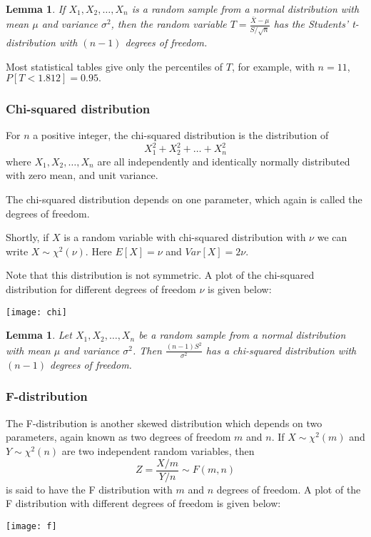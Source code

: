 \documentclass[12pt]{article}
\newtheorem{lemma}[theorem]{Lemma}
\begin{document}
\begin{lemma}
If $X_{1},X_{2},\ldots,X_{n}$ is a random sample from a normal distribution with mean $\mu$ and variance $\sigma^2$, then the random variable $\displaystyle T=\frac{\bar{X}-\mu}{S/\sqrt{n}}$ has the Students' t-distribution with $(n-1)$ degrees of freedom.
\end{lemma}
Most statistical tables give only the percentiles of $T$, for example, with $n=11$, $P[T<1.812]=0.95.$

\subsubsection{Chi-squared distribution}
For $n$ a positive integer, the chi-squared distribution is the distribution of
$$
X_{1}^{2}+X_{2}^{2}+\ldots+X_{n}^{2}
$$
where
$X_{1},X_{2},\ldots,X_{n}$ are all independently and identically normally distributed with zero mean, and unit variance.

The chi-squared distribution depends on one parameter, which again is called the degrees of freedom.

Shortly, if $X$ is a random variable with chi-squared distribution with $\nu$ we can write $X \sim \chi^{2}(\nu)$. Here $E[X]=\nu$ and $Var[X]=2\nu$.

Note that this distribution is not symmetric. A plot of the chi-squared distribution for different degrees of freedom $\nu$ is given below:
\begin{center}
  \texttt{[image: chi]}
\end{center}



\begin{lemma}
Let $X_{1},X_{2},\ldots,X_{n}$ be a random sample from a normal distribution with mean $\mu$ and variance $\sigma^2$. Then $\displaystyle \frac{(n-1)S^{2}}{\sigma^{2}}$ has a chi-squared distribution with $(n-1)$ degrees of freedom.
\end{lemma}


\subsubsection{F-distribution}
The F-distribution is another skewed distribution which depends on two parameters, again known as two degrees of freedom $m$ and $n$. If $X \sim \chi^{2}(m)$ and $Y \sim \chi^{2}(n)$ are two independent random variables, then
$$
Z=\frac{X/m}{Y/n}\sim F(m,n)
$$
is said to have the F distribution with $m$ and $n$ degrees of freedom. A plot of the F distribution with different degrees of freedom  is given below:
\begin{center}
  \texttt{[image: f]}
\end{center}
\end{document}
